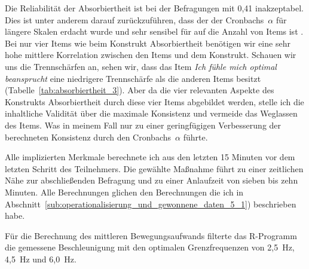 Die Reliabilität der Absorbiertheit ist bei der Befragungen mit 0,41 inakzeptabel. Dies ist unter anderem darauf zurückzuführen, dass der der Cronbachs~$\alpha$ für längere Skalen erdacht wurde und sehr sensibel für auf die Anzahl von Items ist \citep{Cortina1993}. Bei nur vier Items wie beim Konstrukt Absorbiertheit benötigen wir eine sehr hohe mittlere Korrelation zwischen den Items und dem Konstrukt. Schauen wir uns die Trennschärfen an, sehen wir, dass das Item \emph{Ich fühle mich optimal beansprucht} eine niedrigere Trennschärfe als die anderen Items besitzt (Tabelle~\ref{tab:absorbiertheit_3}). Aber da die vier relevanten Aspekte des Konstrukts Absorbiertheit durch diese vier Items abgebildet werden, stelle ich die inhaltliche Validität über die maximale Konsistenz und vermeide das Weglassen des Items. Was in meinem Fall nur zu einer geringfügigen Verbesserung der berechneten Konsistenz durch den Cronbachs~$\alpha$ führte. 

Alle implizierten Merkmale berechnete ich aus den letzten 15 Minuten vor dem letzten Schritt des Teilnehmers. Die gewählte Maßnahme führt zu einer zeitlichen Nähe zur abschließenden Befragung und zu einer Anlaufzeit von sieben bis zehn Minuten. Alle Berechnungen glichen den Berechnungen die ich in Abschnitt~\ref{sub:operationalisierung_und_gewonnene_daten_5_1}) beschrieben habe.

Für die Berechnung des mittleren Bewegungsaufwands filterte das R-Programm die gemessene Beschleunigung mit den optimalen Grenzfrequenzen von 2,5~Hz, 4,5~Hz und 6,0~Hz. 

